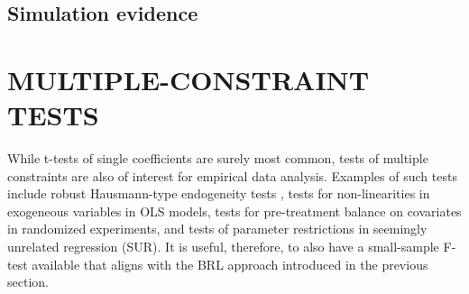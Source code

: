 \documentclass[12pt]{article}
\newcommand{\bm}{\mathbf}
\newcommand{\bs}{\boldsymbol}
\begin{document}

\subsection{Simulation evidence}
\label{subsec:simulation_t}

\section{MULTIPLE-CONSTRAINT TESTS}

While t-tests of single coefficients are surely most common, tests of multiple constraints are also of interest for empirical data analysis. Examples of such tests include robust Hausmann-type endogeneity tests \citep{Arellano1993on}, tests for non-linearities in exogeneous variables in OLS models, tests for pre-treatment balance on covariates in randomized experiments, and tests of parameter restrictions in seemingly unrelated regression (SUR). It is useful, therefore, to also have a small-sample F-test available that aligns with the BRL approach introduced in the previous section.


\end{document}
